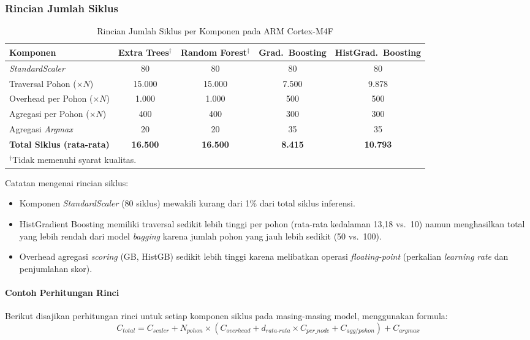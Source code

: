 \subsubsection{Rincian Jumlah Siklus}

\begin{table}[htbp]
\centering
\caption{Rincian Jumlah Siklus per Komponen pada ARM Cortex-M4F}
\label{tab:arm_cycles_detail}
\begin{tabular}{lcccc}
\hline
\textbf{Komponen} & \textbf{Extra Trees$^{\dagger}$} & \textbf{Random Forest$^{\dagger}$} & \textbf{Grad.\ Boosting} & \textbf{HistGrad.\ Boosting} \\
\hline
\textit{StandardScaler} & 80 & 80 & 80 & 80 \\
Traversal Pohon ($\times N$) & 15.000 & 15.000 & 7.500 & 9.878 \\
Overhead per Pohon ($\times N$) & 1.000 & 1.000 & 500 & 500 \\
Agregasi per Pohon ($\times N$) & 400 & 400 & 300 & 300 \\
Agregasi \textit{Argmax} & 20 & 20 & 35 & 35 \\
\hline
\textbf{Total Siklus (rata-rata)} & \textbf{16.500} & \textbf{16.500} & \textbf{8.415} & \textbf{10.793} \\
\hline
\multicolumn{5}{l}{\footnotesize $^{\dagger}$Tidak memenuhi syarat kualitas.}
\end{tabular}
\end{table}

Catatan mengenai rincian siklus:
\begin{itemize}
    \item Komponen \textit{StandardScaler} (80 siklus) mewakili kurang dari 1\% dari total siklus inferensi.
    \item HistGradient Boosting memiliki traversal sedikit lebih tinggi per pohon (rata-rata kedalaman 13,18 vs.\ 10) namun menghasilkan total yang lebih rendah dari model \textit{bagging} karena jumlah pohon yang jauh lebih sedikit (50 vs.\ 100).
    \item Overhead agregasi \textit{scoring} (GB, HistGB) sedikit lebih tinggi karena melibatkan operasi \textit{floating-point} (perkalian \textit{learning rate} dan penjumlahan skor).
\end{itemize}

\paragraph{Contoh Perhitungan Rinci}
Berikut disajikan perhitungan rinci untuk setiap komponen siklus pada masing-masing model, menggunakan formula:
\begin{equation}
    C_{total} = C_{scaler} + N_{pohon} \times (C_{overhead} + d_{rata\text{-}rata} \times C_{per\_node} + C_{agg/pohon}) + C_{argmax}
\end{equation}

